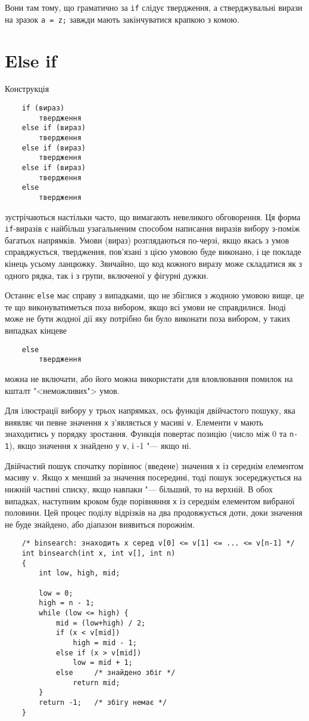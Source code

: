 \documentclass[a4paper,12pt]{book}
\begin{document}
  Вони там тому, що граматично за \texttt{if} слідує твердження, а стверджувальні вирази
  на зразок \texttt{a = z;} завжди мають закінчуватися крапкою з комою.

\section{Else if}

\label{f0:ch3.3}
  Конструкція
  \begin{verbatim}
    if (вираз)
        твердження
    else if (вираз)
        твердження
    else if (вираз)
        твердження
    else if (вираз)
        твердження
    else
        твердження
  \end{verbatim}
  зустрічаються настільки часто, що вимагають невеликого обговорення. Ця форма
  \texttt{if}-виразів є найбільш узагальненим способом написання виразів вибору
  з-поміж багатьох напрямків. Умови (вираз) розглядаються по-черзі, якщо якась з умов
  справджується, твердження, пов'язані з цією умовою буде виконано, і це покладе
  кінець усьому ланцюжку. Звичайно, що код кожного виразу може складатися як з одного
  рядка, так і з групи, включеної у фігурні дужки.

  Останнє \texttt{else} має справу з випадками, що не збіглися з жодною умовою вище, це те
  що виконуватиметься поза вибором, якщо всі умови не справдилися. Іноді може не бути
  жодної дії яку потрібно би було виконати поза вибором, у таких випадках кінцеве
  \begin{verbatim}
    else
        твердження
  \end{verbatim}
  можна не включати, або його можна використати для вловлювання помилок на кшталт
  "<неможливих"> умов.

  Для ілюстрації вибору у трьох напрямках, ось функція двійчастого пошуку, яка виявляє
  чи певне значення \texttt{x} з'являється у масиві \texttt{v}. Елементи
  \texttt{v} мають знаходитись у порядку зростання. Функція повертає позицію (число між 0
  та \texttt{n-1}), якщо значення \texttt{x} знайдено у \texttt{v}, і -1 "--- якщо ні.

  Двійчастий пошук спочатку порівнює (введене) значення \texttt{x} із середнім
  елементом масиву \texttt{v}. Якщо \texttt{x} менший за значення посередині,
  тоді пошук зосереджується на нижній частині списку, якщо навпаки "--- більший,
  то на верхній. В обох випадках, наступним кроком буде порівняння \texttt{x}
  із середнім елементом вибраної половини. Цей процес поділу відрізків на два
  продовжується доти, доки значення не буде знайдено, або діапазон виявиться
  порожнім.
  \begin{verbatim}
    /* binsearch: знаходить x серед v[0] <= v[1] <= ... <= v[n-1] */
    int binsearch(int x, int v[], int n)
    {
        int low, high, mid;

        low = 0;
        high = n - 1;
        while (low <= high) {
            mid = (low+high) / 2;
            if (x < v[mid])
                high = mid - 1;
            else if (x > v[mid])
                low = mid + 1;
            else     /* знайдено збіг */
                return mid;
        }
        return -1;   /* збігу немає */
    }
  \end{verbatim}
\end{document}
